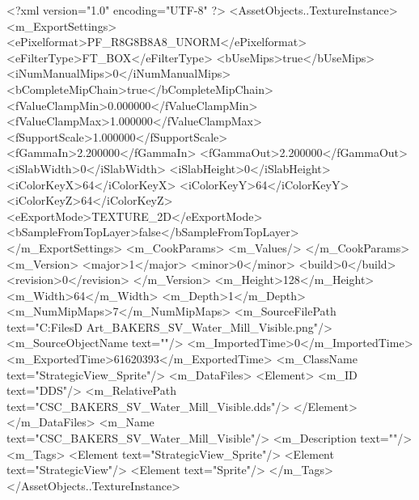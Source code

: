 <?xml version="1.0" encoding="UTF-8" ?>
<AssetObjects..TextureInstance>
	<m_ExportSettings>
		<ePixelformat>PF_R8G8B8A8_UNORM</ePixelformat>
		<eFilterType>FT_BOX</eFilterType>
		<bUseMips>true</bUseMips>
		<iNumManualMips>0</iNumManualMips>
		<bCompleteMipChain>true</bCompleteMipChain>
		<fValueClampMin>0.000000</fValueClampMin>
		<fValueClampMax>1.000000</fValueClampMax>
		<fSupportScale>1.000000</fSupportScale>
		<fGammaIn>2.200000</fGammaIn>
		<fGammaOut>2.200000</fGammaOut>
		<iSlabWidth>0</iSlabWidth>
		<iSlabHeight>0</iSlabHeight>
		<iColorKeyX>64</iColorKeyX>
		<iColorKeyY>64</iColorKeyY>
		<iColorKeyZ>64</iColorKeyZ>
		<eExportMode>TEXTURE_2D</eExportMode>
		<bSampleFromTopLayer>false</bSampleFromTopLayer>
	</m_ExportSettings>
	<m_CookParams>
		<m_Values/>
	</m_CookParams>
	<m_Version>
		<major>1</major>
		<minor>0</minor>
		<build>0</build>
		<revision>0</revision>
	</m_Version>
	<m_Height>128</m_Height>
	<m_Width>64</m_Width>
	<m_Depth>1</m_Depth>
	<m_NumMipMaps>7</m_NumMipMaps>
	<m_SourceFilePath text="C:\Users\Shadow\Desktop\Working Files\2D Art\Quarters\Bakers\StrategicView\CSC_BAKERS_SV_Water_Mill_Visible.png"/>
	<m_SourceObjectName text=""/>
	<m_ImportedTime>0</m_ImportedTime>
	<m_ExportedTime>61620393</m_ExportedTime>
	<m_ClassName text="StrategicView_Sprite"/>
	<m_DataFiles>
		<Element>
			<m_ID text="DDS"/>
			<m_RelativePath text="CSC_BAKERS_SV_Water_Mill_Visible.dds"/>
		</Element>
	</m_DataFiles>
	<m_Name text="CSC_BAKERS_SV_Water_Mill_Visible"/>
	<m_Description text=""/>
	<m_Tags>
		<Element text="StrategicView_Sprite"/>
		<Element text="StrategicView"/>
		<Element text="Sprite"/>
	</m_Tags>
</AssetObjects..TextureInstance>

